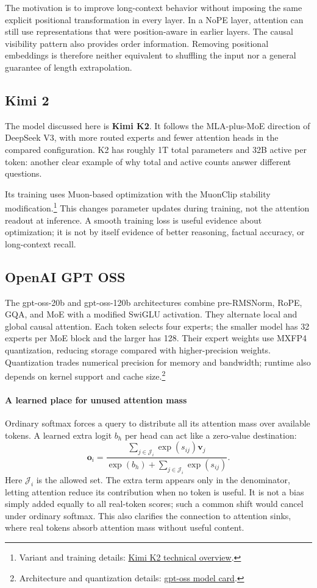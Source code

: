 \documentclass[11pt, oneside]{book}
\let\originalsubsection\subsection
\renewcommand{\subsection}{\Needspace{6\baselineskip}\originalsubsection}
\begin{document}
The motivation is to improve long-context behavior without imposing the same explicit positional transformation in every layer. In a NoPE layer, attention can still use representations that were position-aware in earlier layers. The causal visibility pattern also provides order information. Removing positional embeddings is therefore neither equivalent to shuffling the input nor a general guarantee of length extrapolation.

\subsection{Kimi 2}\label{sec:source-5-4-9}
The model discussed here is \textbf{Kimi K2}. It follows the MLA-plus-MoE direction of DeepSeek V3, with more routed experts and fewer attention heads in the compared configuration. K2 has roughly 1T total parameters and 32B active per token: another clear example of why total and active counts answer different questions.

Its training uses Muon-based optimization with the MuonClip stability modification.\footnote{Variant and training details: \href{https://github.com/MoonshotAI/Kimi-K2}{Kimi K2 technical overview}.} This changes parameter updates during training, not the attention readout at inference. A smooth training loss is useful evidence about optimization; it is not by itself evidence of better reasoning, factual accuracy, or long-context recall.

\subsection{OpenAI GPT OSS}\label{sec:source-5-4-10}
The gpt-oss-20b and gpt-oss-120b architectures combine pre-RMSNorm, RoPE, GQA, and MoE with a modified SwiGLU activation. They alternate local and global causal attention. Each token selects four experts; the smaller model has 32 experts per MoE block and the larger has 128. Their expert weights use MXFP4 quantization, reducing storage compared with higher-precision weights. Quantization trades numerical precision for memory and bandwidth; runtime also depends on kernel support and cache size.\footnote{Architecture and quantization details: \href{https://deploymentsafety.openai.com/gpt-oss/a2}{gpt-oss model card}.}

\paragraph{A learned place for unused attention mass} Ordinary softmax forces a query to distribute all its attention mass over available tokens. A learned extra logit $b_h$ per head can act like a zero-value destination:
\[
 \mathbf{o}_i=
 \frac{\sum_{j\in\mathcal{J}_i}\exp(s_{ij})\mathbf{v}_j}
 {\exp(b_h)+\sum_{j\in\mathcal{J}_i}\exp(s_{ij})}.
\]
Here $\mathcal{J}_i$ is the allowed set. The extra term appears only in the denominator, letting attention reduce its contribution when no token is useful. It is not a bias simply added equally to all real-token scores; such a common shift would cancel under ordinary softmax. This also clarifies the connection to attention sinks, where real tokens absorb attention mass without useful content.
\end{document}
